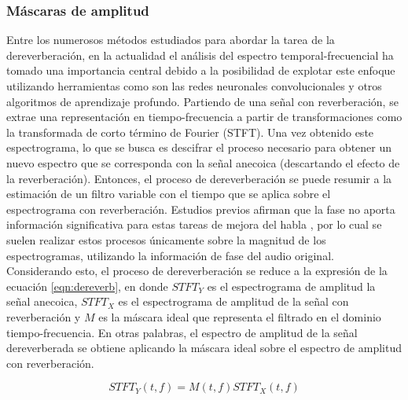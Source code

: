 \subsubsection{Máscaras de amplitud}

Entre los numerosos métodos estudiados para abordar la tarea de la dereverberación, en la actualidad el análisis del espectro temporal-frecuencial ha tomado una importancia central debido a la posibilidad de explotar este enfoque utilizando herramientas como son las redes neuronales convolucionales y otros algoritmos de aprendizaje profundo. Partiendo de una señal con reverberación, se extrae una representación en tiempo-frecuencia a partir de transformaciones como la transformada de corto término de Fourier (STFT). Una vez obtenido este espectrograma, lo que se busca es descifrar el proceso necesario para obtener un nuevo espectro que se corresponda con la señal anecoica (descartando el efecto de la reverberación). Entonces, el proceso de dereverberación se puede resumir a la estimación de un filtro variable con el tiempo que se aplica sobre el espectrograma con reverberación. Estudios previos afirman que la fase no aporta información significativa para estas tareas de mejora del habla \cite{fase1}\cite{fase2}, por lo cual se suelen realizar estos procesos únicamente sobre la magnitud de los espectrogramas, utilizando la información de fase del audio original. Considerando esto, el proceso de dereverberación se reduce a la expresión de la ecuación \ref{eqn:dereverb}, en donde $STFT_{Y}$ es el espectrograma de amplitud la señal anecoica, $STFT_{X}$ es el espectrograma de amplitud de la señal con reverberación y $M$ es la máscara ideal que representa el filtrado en el dominio tiempo-frecuencia. En otras palabras, el espectro de amplitud de la señal dereverberada se obtiene aplicando la máscara ideal sobre el espectro de amplitud con reverberación. 
 
\begin{equation}
\label{eqn:dereverb}
	STFT_{Y}(t,f)= M(t,f) STFT_{X}(t,f) 
\end{equation}

